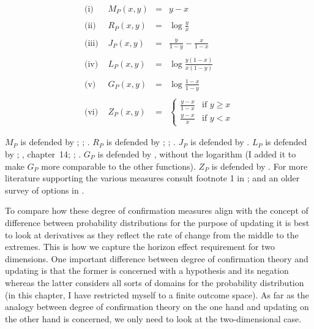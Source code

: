 \documentclass[phd,12pt,oneside]{ubcthesis}
\begin{document}
\begin{equation}
  \label{eq:relevance}
  \begin{array}{lrcl}
    \mbox{(i) } & M_{P}(x,y)&=&y-x \\
                &&& \\
    \mbox{(ii) } & R_{P}(x,y)&=&\displaystyle\log\frac{y}{x} \\
                &&& \\
    \mbox{(iii) } & J_{P}(x,y)&=&\displaystyle\frac{y}{1-y}-\frac{x}{1-x} \\
                &&& \\
    \mbox{(iv) } & L_{P}(x,y)&=&\displaystyle\log\frac{y(1-x)}{x(1-y)} \\
                &&& \\
    \mbox{(v) } & G_{P}(x,y)&=&\displaystyle\log\frac{1-x}{1-y} \\
                &&& \\
    \mbox{(vi) } & Z_{P}(x,y)&=&\left\{
                                 \begin{array}{cl}
                                   \displaystyle\frac{y-x}{1-x}&\mbox{if }y\geq{}x \\
                                   \displaystyle\frac{y-x}{x}&\mbox{if }y<x
                                 \end{array}\right.
  \end{array}
\end{equation}

{\noindent}$M_{P}$ is defended by ; ;
. $R_{P}$ is defended by
; ; .
$J_{P}$ is defended by . $L_{P}$ is defended by
; , chapter~14;
; . $G_{P}$ is defended
by , without the logarithm (I added it to
make $G_{P}$ more comparable to the other functions). $Z_{P}$ is
defended by . For more literature supporting
the various measures consult footnote 1 in
; and an older survey of options in
.

To compare how these degree of confirmation measures align with the
concept of difference between probability distributions for the
purpose of updating it is best to look at derivatives as they reflect
the rate of change from the middle to the extremes. This is how we
capture the horizon effect requirement for two dimensions. One
important difference between degree of confirmation theory and
updating is that the former is concerned with a hypothesis and its
negation whereas the latter considers all sorts of domains for the
probability distribution (in this chapter, I have restricted myself to
a finite outcome space). As far as the analogy between degree of
confirmation theory on the one hand and updating on the other hand is
concerned, we only need to look at the two-dimensional case.
\end{document}
